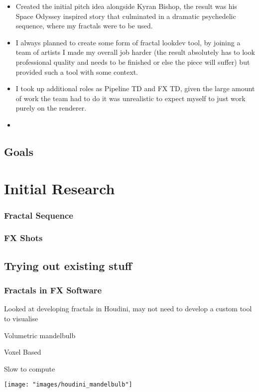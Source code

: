 \documentclass[11pt,a4paper,final,notitlepage]{report}
\begin{document}
\begin{itemize}
	\item Created the initial pitch idea alongside Kyran Bishop, the result was his Space Odyssey inspired story that culminated in a dramatic psychedelic sequence, where my fractals were to be used. 
	\item I always planned to create some form of fractal lookdev tool, by joining a team of artists I made my overall job harder (the result absolutely has to look professional quality and needs to be finished or else the piece will suffer) but provided such a tool with some context.
	\item I took up additional roles as Pipeline TD and FX TD, given the large amount of work the team had to do it was unrealistic to expect myself to just work purely on the renderer.
	\item <Explain report overview>
\end{itemize}

\section{Goals}

\chapter{Initial Research}

\subsection{Fractal Sequence}
\subsection{FX Shots}

\section{Trying out existing stuff}
\subsection{Fractals in FX Software}
Looked at developing fractals in Houdini, may not need to develop a custom tool to visualise

Volumetric mandelbulb

Voxel Based

Slow to compute

\begin{center}
\texttt{[image: "images/houdini\_mandelbulb"]}
\end{center}
\end{document}
